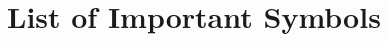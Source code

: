 \documentclass[11pt]{article}
\begin{document}
	\section{List of Important Symbols}
	
	
	
\end{document}
